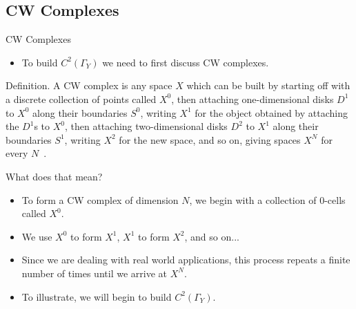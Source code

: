 \documentclass{beamer}
\newcommand{\Y}{\Gamma_Y}
\newcommand{\C}{$C^2(\Y)$}
\begin{document}
\subsection{CW Complexes}
\begin{frame}{CW Complexes}
\begin{itemize}
\item To build $C^2(\Y)$ we need to first discuss CW complexes.\pause
\end{itemize}

\begin{block}{Definition.}
A CW complex is any space $X$ which can be built by starting off with a discrete collection of points called $X^0$, then attaching one-dimensional disks $D^1$ to $X^0$ along their boundaries $S^0$, writing $X^1$ for the object obtained by attaching the $D^1$s to $X^0$, then attaching two-dimensional disks $D^2$ to $X^1$ along their boundaries $S^1$, writing $X^2$ for the new space, and so on, giving spaces $X^N$ for every $N$~\cite{CW}.
\end{block}
\end{frame}

\begin{frame}{What does that mean?}
\begin{itemize}
\item To form a CW complex of dimension $N$, we begin with a collection of $0$-cells called $X^0$.\pause
\item We use $X^0$ to form $X^1$, $X^1$ to form $X^2$, and so on... \pause
\item Since we are dealing with real world applications, this process repeats a finite number of times until we arrive at $X^N$. \pause
\item To illustrate, we will begin to build \C.
\end{itemize}
\end{frame}
\end{document}
